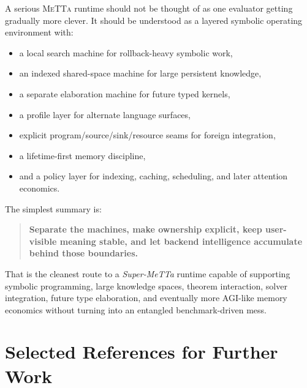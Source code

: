 \documentclass[11pt]{article}
\newcommand{\metta}{\textsc{MeTTa}}
\begin{document}
A serious \metta{} runtime should not be thought of as one evaluator getting gradually more clever. It should be understood as a layered symbolic operating environment with:
\begin{itemize}[leftmargin=2em]
  \item a local search machine for rollback-heavy symbolic work,
  \item an indexed shared-space machine for large persistent knowledge,
  \item a separate elaboration machine for future typed kernels,
  \item a profile layer for alternate language surfaces,
  \item explicit program/source/sink/resource seams for foreign integration,
  \item a lifetime-first memory discipline,
  \item and a policy layer for indexing, caching, scheduling, and later attention economics.
\end{itemize}

The simplest summary is:
\begin{quote}
\textbf{Separate the machines, make ownership explicit, keep user-visible meaning stable, and let backend intelligence accumulate behind those boundaries.}
\end{quote}

That is the cleanest route to a \emph{Super-MeTTa} runtime capable of supporting symbolic programming, large knowledge spaces, theorem interaction, solver integration, future type elaboration, and eventually more AGI-like memory economics without turning into an entangled benchmark-driven mess.

\section*{Selected References for Further Work}
\end{document}
